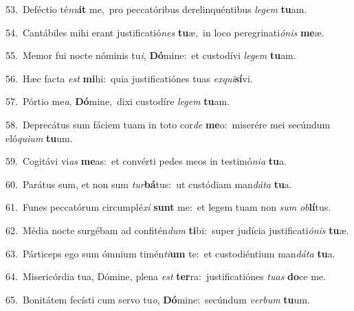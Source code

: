 {\numbfont\textcolor{\numbcolor}{53.}}~Deféctio té\-\textit{nu}\-\textbf{it} me,~\star pro peccatóribus derelinquéntibus \textit{le}\-\textit{gem} \textbf{tu}\-am.\par
{\numbfont\textcolor{\numbcolor}{54.}}~Cantábiles mihi erant justificatió\textit{nes} \textbf{tu}\-æ,~\star in loco peregrinati\-\textit{ó}\-\textit{nis} \textbf{me}\-æ.\par
{\numbfont\textcolor{\numbcolor}{55.}}~Memor fui nocte nóminis tu\-\textit{i}\-, \textbf{Dó}\-mine:~\star et custodívi \textit{le}\-\textit{gem} \textbf{tu}\-am.\par
{\numbfont\textcolor{\numbcolor}{56.}}~Hæc facta \textit{est} \textbf{mi}\-hi:~\star quia justificatiónes tuas \textit{ex}\-\textit{qui}\textbf{sí}vi.\par
{\numbfont\textcolor{\numbcolor}{57.}}~Pórtio me\-\textit{a}\-, \textbf{Dó}\-mine,~\star dixi custodíre \textit{le}\-\textit{gem} \textbf{tu}\-am.\par
{\numbfont\textcolor{\numbcolor}{58.}}~Deprecátus sum fáciem tuam in toto cor\textit{de} \textbf{me}\-o:~\star miserére mei secúndum eló\-\textit{qui}\-\textit{um} \textbf{tu}\-um.\par
{\numbfont\textcolor{\numbcolor}{59.}}~Cogitávi vi\textit{as} \textbf{me}\-as:~\star et convérti pedes meos in testimó\-\textit{ni}\-\textit{a} \textbf{tu}\-a.\par
{\numbfont\textcolor{\numbcolor}{60.}}~Parátus sum, et non sum \textit{tur}\-\textbf{bá}tus:~\star ut custódiam man\-\textit{dá}\-\textit{ta} \textbf{tu}\-a.\par
{\numbfont\textcolor{\numbcolor}{61.}}~Funes peccatórum circumplé\textit{xi} \textbf{sunt} me:~\star et legem tuam non \textit{sum} \textit{ob}\-\textbf{lí}tus.\par
{\numbfont\textcolor{\numbcolor}{62.}}~Média nocte surgébam ad confitén\textit{dum} \textbf{ti}\-bi:~\star super judícia justificati\-\textit{ó}\-\textit{nis} \textbf{tu}\-æ.\par
{\numbfont\textcolor{\numbcolor}{63.}}~Párticeps ego sum ómnium timén\-\textit{ti}\-\textbf{um} te:~\star et custodiéntium man\-\textit{dá}\-\textit{ta} \textbf{tu}\-a.\par
{\numbfont\textcolor{\numbcolor}{64.}}~Misericórdia tua, Dómine, plena \textit{est} \textbf{ter}\-ra:~\star justificatiónes \textit{tu}\-\textit{as} \textbf{do}\-ce me.\par
{\numbfont\textcolor{\numbcolor}{65.}}~Bonitátem fecísti cum servo tu\-\textit{o}\-, \textbf{Dó}\-mine:~\star secúndum \textit{ver}\-\textit{bum} \textbf{tu}\-um.\par
